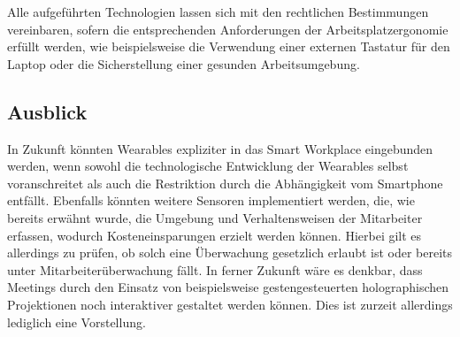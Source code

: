 Alle aufgeführten Technologien lassen sich mit den rechtlichen Bestimmungen vereinbaren, sofern die entsprechenden Anforderungen der Arbeitsplatzergonomie erfüllt werden, wie beispielsweise die Verwendung einer externen Tastatur für den Laptop oder die Sicherstellung einer gesunden Arbeitsumgebung.

\subsection{Ausblick}
In Zukunft könnten Wearables expliziter in das Smart Workplace eingebunden werden, wenn sowohl die technologische Entwicklung der Wearables selbst voranschreitet als auch die Restriktion durch die Abhängigkeit vom Smartphone entfällt. Ebenfalls könnten weitere Sensoren implementiert werden, die, wie bereits erwähnt wurde, die Umgebung und Verhaltensweisen der Mitarbeiter erfassen, wodurch Kosteneinsparungen erzielt werden können. Hierbei gilt es allerdings zu prüfen, ob solch eine Überwachung gesetzlich erlaubt ist oder bereits unter Mitarbeiterüberwachung fällt. In ferner Zukunft wäre es denkbar, dass Meetings durch den Einsatz von beispielsweise gestengesteuerten holographischen Projektionen noch interaktiver gestaltet werden können. Dies ist zurzeit allerdings lediglich eine Vorstellung.